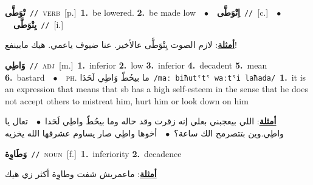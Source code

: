 \documentclass[10pt,a4paper,twoside]{article} %
\begin{document}
\begin{multicols}{2}
{\setlength\topsep{0pt}\textbf{\foreignlanguage{arabic}{تْوَطَّى}}\ {\color{gray}\texttt{//}\color{black}}\ \textsc{verb}\ [p.]\ \textbf{1.}~be lowered.  \textbf{2.}~be made low\ \ $\bullet$\ \ \setlength\topsep{0pt}\textbf{\foreignlanguage{arabic}{اِتْوَطَّى}}\ {\color{gray}\texttt{//}\color{black}}\ [c.]\ \ $\bullet$\ \ \setlength\topsep{0pt}\textbf{\foreignlanguage{arabic}{يِتْوَطَّى}}\ {\color{gray}\texttt{//}\color{black}}\ [i.]\  \begin{flushright}\color{gray}\foreignlanguage{arabic}{\textbf{\underline{\foreignlanguage{arabic}{أمثلة}}}: لازم الصوت يِتْوَطَّى عالأخير. عنا ضيوف ياعمي. هيك مابينفع!}\end{flushright}\color{black}} \vspace{2mm}

{\setlength\topsep{0pt}\textbf{\foreignlanguage{arabic}{وَاطِي}}\ {\color{gray}\texttt{//}\color{black}}\ \textsc{adj}\ [m.]\ \textbf{1.}~inferior  \textbf{2.}~low  \textbf{3.}~inferior  \textbf{4.}~decadent  \textbf{5.}~mean  \textbf{6.}~bastard\ \ $\bullet$\ \ \textsc{ph.} \color{gray} \foreignlanguage{arabic}{ما بيحُطّ وَاطِي لَحَدَا}\color{black}\ {\color{gray}\texttt{/{\sffamily maː biħutˤtˤ waːtˤi laħada}/}\color{black}}\ \textbf{1.}~it is an expression that means that sb has a high self-esteem in the sense that he does not accept others to mistreat him, hurt him or look down on him\  \begin{flushright}\color{gray}\foreignlanguage{arabic}{\textbf{\underline{\foreignlanguage{arabic}{أمثلة}}}: اللي بيعجبني بعلي إنه زقرت وقد حاله وما بيحُطّ واطِي لَحَدا\ $\bullet$\ \  تعال يا واطِي.وين بتتصرمح الك ساعة؟\ $\bullet$\ \  أخوها واطِي صار يساوم عشرفها الله يخزيه}\end{flushright}\color{black}} \vspace{2mm}

{\setlength\topsep{0pt}\textbf{\foreignlanguage{arabic}{وَطَاوِة}}\ {\color{gray}\texttt{//}\color{black}}\ \textsc{noun}\ [f.]\ \textbf{1.}~inferiority  \textbf{2.}~decadence\  \begin{flushright}\color{gray}\foreignlanguage{arabic}{\textbf{\underline{\foreignlanguage{arabic}{أمثلة}}}: ماعمريش شفت وطاوِة أكثر زي هيك}\end{flushright}\color{black}} \vspace{2mm}


\end{multicols}
\end{document}
